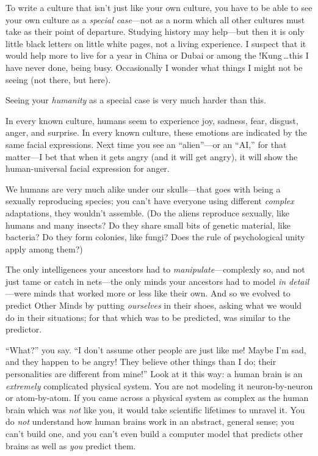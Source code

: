  To write a culture that isn't just like your own
culture, you have to be able to see your own culture as a
\textit{special case}{}---not as a norm which all other cultures must
take as their point of departure. Studying history may help---but then
it is only little black letters on little white pages, not a living
experience. I suspect that it would help more to live for a year in
China or Dubai or among the !Kung\,\ldots this I have never done, being
busy. Occasionally I wonder what things I might not be seeing (not
there, but here).


 Seeing your \textit{humanity} as a special case is very much
harder than this.


 In every known culture, humans seem to experience joy, sadness,
fear, disgust, anger, and surprise. In every known culture, these
emotions are indicated by the same facial expressions. Next time you
see an ``alien''---or an
``AI,'' for that matter---I bet that
when it gets angry (and it will get angry), it will show the
human-universal facial expression for anger.


 We humans are very much alike under our skulls---that goes with
being a sexually reproducing species; you can't have
everyone using different \textit{complex} adaptations, they
wouldn't assemble. (Do the aliens reproduce sexually,
like humans and many insects? Do they share small bits of genetic
material, like bacteria? Do they form colonies, like fungi? Does the
rule of psychological unity apply among them?)


 The only intelligences your ancestors had to
\textit{manipulate}{}---complexly so, and not just tame or catch in
nets---the only minds your ancestors had to model \textit{in
detail}{}---were minds that worked more or less like their own. And so
we evolved to predict Other Minds by putting \textit{ourselves} in
their shoes, asking what we would do in their situations; for that
which was to be predicted, was similar to the predictor.


 ``What?'' you say.
``I don't assume other people are just
like me! Maybe I'm sad, and they happen to be angry!
They believe other things than I do; their personalities are different
from mine!'' Look at it this way: a human brain is an
\textit{extremely} complicated physical system. You are not modeling it
neuron-by-neuron or atom-by-atom. If you came across a physical system
as complex as the human brain which was \textit{not} like you, it would
take scientific lifetimes to unravel it. You do \textit{not} understand
how human brains work in an abstract, general sense; you
can't build one, and you can't even
build a computer model that predicts other brains as well as
\textit{you} predict them.


